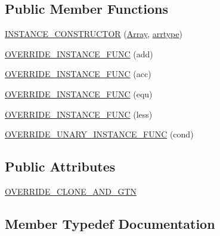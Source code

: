 \subsection*{Public Member Functions}
\begin{DoxyCompactItemize}
\item 
\mbox{\hyperlink{class_erable_1_1_erable_1_1_types_1_1_array_afee721ff208849298512f8d92c29ecb4}{I\+N\+S\+T\+A\+N\+C\+E\+\_\+\+C\+O\+N\+S\+T\+R\+U\+C\+T\+OR}} (\mbox{\hyperlink{class_erable_1_1_erable_1_1_types_1_1_array}{Array}}, \mbox{\hyperlink{class_erable_1_1_erable_1_1_types_1_1_array_ac691ce334c0eea6cfadc7877db148ccf}{arrtype}})
\item 
\mbox{\hyperlink{class_erable_1_1_erable_1_1_types_1_1_array_a34fbaf9668691c6a765c52693073f83c}{O\+V\+E\+R\+R\+I\+D\+E\+\_\+\+I\+N\+S\+T\+A\+N\+C\+E\+\_\+\+F\+U\+NC}} (add)
\item 
\mbox{\hyperlink{class_erable_1_1_erable_1_1_types_1_1_array_a89207432021c22f50f2cb233a8ca40fd}{O\+V\+E\+R\+R\+I\+D\+E\+\_\+\+I\+N\+S\+T\+A\+N\+C\+E\+\_\+\+F\+U\+NC}} (acc)
\item 
\mbox{\hyperlink{class_erable_1_1_erable_1_1_types_1_1_array_a430217fdf173ae4feffa0ecaf0a52b97}{O\+V\+E\+R\+R\+I\+D\+E\+\_\+\+I\+N\+S\+T\+A\+N\+C\+E\+\_\+\+F\+U\+NC}} (equ)
\item 
\mbox{\hyperlink{class_erable_1_1_erable_1_1_types_1_1_array_a5559fff8fb43fb427e717062469f1e65}{O\+V\+E\+R\+R\+I\+D\+E\+\_\+\+I\+N\+S\+T\+A\+N\+C\+E\+\_\+\+F\+U\+NC}} (less)
\item 
\mbox{\hyperlink{class_erable_1_1_erable_1_1_types_1_1_array_a300cc43085ff949a3fb7f69099373487}{O\+V\+E\+R\+R\+I\+D\+E\+\_\+\+U\+N\+A\+R\+Y\+\_\+\+I\+N\+S\+T\+A\+N\+C\+E\+\_\+\+F\+U\+NC}} (cond)
\end{DoxyCompactItemize}
\subsection*{Public Attributes}
\begin{DoxyCompactItemize}
\item 
\mbox{\hyperlink{class_erable_1_1_erable_1_1_types_1_1_array_ac0aa982c038f07ce843551be2e6f52ac}{O\+V\+E\+R\+R\+I\+D\+E\+\_\+\+C\+L\+O\+N\+E\+\_\+\+A\+N\+D\+\_\+\+G\+TN}}
\end{DoxyCompactItemize}


\subsection{Member Typedef Documentation}
\mbox{\label{class_erable_1_1_erable_1_1_types_1_1_array_ac691ce334c0eea6cfadc7877db148ccf}} 
